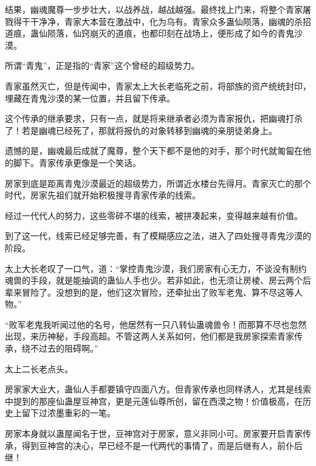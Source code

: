 \begin{this_body}
结果，幽魂魔尊一步步壮大，以战养战，越战越强。最终找上门来，将整个青家屠戮得干干净净，青家大本营在激战中，化为乌有。青家众多蛊仙陨落，幽魂的杀招道痕，蛊仙陨落，仙窍崩灭的道痕，也都印刻在战场上，便形成了如今的青鬼沙漠。

所谓“青鬼”，正是指的“青家”这个曾经的超级势力。

青家虽然灭亡，但是传闻中，青家太上大长老临死之前，将部族的资产统统封印，埋藏在青鬼沙漠的某一位置，并且留下传承。

这个传承的继承要求，只有一点，就是将来继承者必须为青家报仇，把幽魂打杀了！若是幽魂已经死了，那就将报仇的对象转移到幽魂的亲朋徒弟身上。

遗憾的是，幽魂最后成就了魔尊，整个天下都不是他的对手，那个时代就匍匐在他的脚下。青家传承更像是一个笑话。

房家到底是距离青鬼沙漠最近的超级势力，所谓近水楼台先得月。青家灭亡的那个时代，房家先祖们就开始积极搜寻青家传承的线索。

经过一代代人的努力，这些零碎不堪的线索，被拼凑起来，变得越来越有价值。

到了这一代，线索已经足够完善，有了模糊感应之法，进入了四处搜寻青鬼沙漠的阶段。

太上大长老叹了一口气，道：“掌控青鬼沙漠，我们房家有心无力，不谈没有制约魂兽的手段，就是能抽调的蛊仙人手也少。若非如此，也无须让房棱、房云两个后辈来冒险了。没想到的是，他们这次冒险，还牵扯出了败军老鬼、算不尽这等人物。”

“败军老鬼我听闻过他的名号，他居然有一只八转仙蛊魂兽令！而那算不尽也忽然出现，来历神秘，手段高超。不管这两人关系如何，他们都是我房家探索青家传承，绕不过去的阻碍啊。”

太上二长老点头。

房家家大业大，蛊仙人手都要镇守四面八方。但青家传承也同样诱人，尤其是线索中提到的那座仙蛊屋豆神宫，更是元莲仙尊所创，留在西漠之物！价值极高，在历史上留下过浓墨重彩的一笔。

房家本身就以蛊屋闻名于世，豆神宫对于房家，意义非同小可。房家要开启青家传承，得到豆神宫的决心，早已经不是一代两代的事情了，而是后继有人，前仆后继！

\end{this_body}

